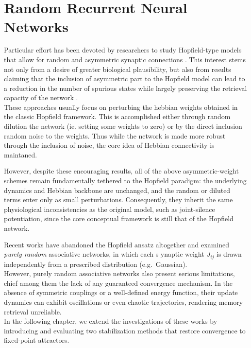 \documentclass[a4paper,12pt]{report}
\begin{document}
\chapter{Random Recurrent Neural Networks}\label{sec:random_rnn}

Particular effort has been devoted by researchers to study Hopfield-type models that 
allow for random and asymmetric synaptic connections \cite{Sompolinsky1988, 
Crisanti1987, Derrida1987, Xu1996}. 
This interest stems not only from a desire of greater biological plausibility, but 
also from results claiming that the inclusion of asymmetric part to the Hopfield 
model can lead to a reduction in the number of spurious states while largely 
preserving the retrieval capacity of the network 
\cite{Parisi_1986, Hertz1986, Chengxiang2000}.\\
These approaches usually focus on perturbing the hebbian weights obtained in the 
classic Hopfield framework. This is accomplished either through random dilution the 
network (ie. setting some weights to zero) or by the direct inclusion random noise to 
the weights. Thus while the network is made more robust through the inclusion of noise, 
the core idea of Hebbian connectivity is maintaned. 

However, despite these encouraging results, all of the above asymmetric-weight schemes 
remain fundamentally tethered to the Hopfield paradigm: the underlying dynamics and 
Hebbian backbone are unchanged, and the random or diluted terms enter only as small 
perturbations. Consequently, they inherit the same physiological inconsistencies as 
the original model, such as joint-silence potentiation, since the core conceptual 
framework is still that of the Hopfield network.

Recent works\cite{Scardecchia2023,Student2024} have abandoned the Hopfield ansatz 
altogether and examined {\em purely random} associative networks, in which each s
ynaptic weight \(J_{ij}\) is drawn independently from a prescribed distribution 
(e.g.\ Gaussian). \\
However, purely random associative networks also present serious limitations, chief 
among them the lack of any guaranteed convergence mechanism.  In the absence of 
symmetric couplings or a well-defined energy function, their update dynamics can 
exhibit oscillations or even chaotic trajectories, rendering memory retrieval 
unreliable.  \\
In the following chapter, we extend the investigations of 
these works by introducing and evaluating two stabilization methods that restore 
convergence to fixed-point attractors.  
\end{document}
